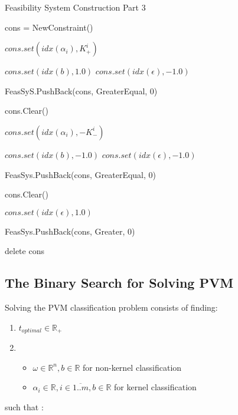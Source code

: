 \documentclass[a4paper,twoside,10pt]{report}
\begin{document}
	\begin{algorithm}
	
	\caption{Feasibility System Construction Part 3}
	\label{feassystemconstruction3}		
	
	\begin{center}
	\begin{algorithmic}		
	
	\STATE cons = NewConstraint()
	
		\STATE \(cons.set(idx(\alpha_i), K^i_+)\)
	\ENDFOR
	
	\STATE \(cons.set(idx(b), 1.0)\)
	\STATE \(cons.set(idx(\epsilon), -1.0)\)
	
	\STATE FeasSyS.PushBack(cons, GreaterEqual, 0)
	
	
	\STATE cons.Clear()
	
		\STATE \(cons.set(idx(\alpha_i), -K^i_-)\)
	\ENDFOR
	
	\STATE \(cons.set(idx(b), -1.0)\)
	\STATE \(cons.set(idx(\epsilon), -1.0)\)
	
	\STATE FeasSys.PushBack(cons, GreaterEqual, 0)
	
	\STATE cons.Clear()
	
	\STATE \(cons.set(idx(\epsilon), 1.0)\)
	
	\STATE FeasSys.PushBack(cons, Greater, 0)
	
	\STATE delete cons
	
	
	\end{algorithmic}
	\end{center}
	\end{algorithm}	
	\clearpage
			
\subsection{The Binary Search for Solving PVM}

	Solving the PVM classification problem consists of finding:
	
	\begin{enumerate} 
		\item \(t_{optimal}\in\mathbb{R}_+\) 
		\item \begin{itemize}
						\item \(\omega\in\mathbb{R}^n, b\in\mathbb{R}\) for non-kernel classification
						\item \(\alpha _i \in \mathbb{R}, i\in\overline{1..m}, b\in\mathbb{R}\) for kernel classification
					\end{itemize}
	\end{enumerate}
such that :
	
\end{document}
